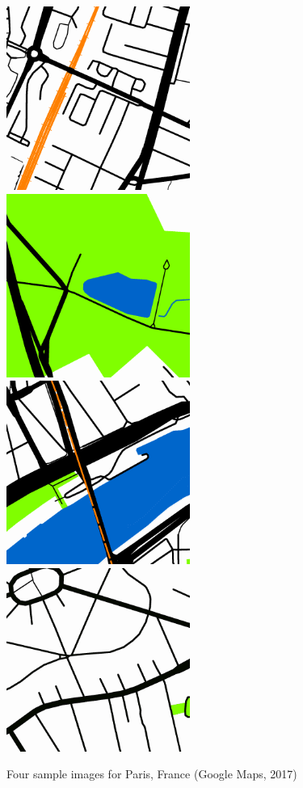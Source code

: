 \documentclass[final,3p,times,authoryear]{elsarticle}
\begin{document}
 
\begin{figure}[!htbp] \label{fig:maps}  
    \centering    
\includegraphics[scale=1]{Images/Map1.png} 
\includegraphics[scale=1]{Images/Map2.png} 
\includegraphics[scale=1]{Images/Map3.png} 
\includegraphics[scale=1]{Images/Map4.png}  
\caption{Four sample images for Paris, France (Google Maps, 2017)}    
\end{figure} 
 
\end{document}
